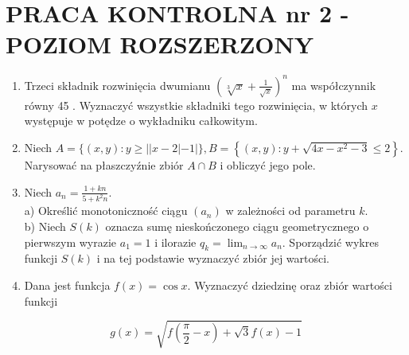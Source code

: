 \documentclass[10pt]{article}
\begin{document}
\section*{PRACA KONTROLNA nr 2 - POZIOM ROZSZERZONY}
\begin{enumerate}
  \item Trzeci składnik rozwinięcia dwumianu $\left(\sqrt[3]{x}+\frac{1}{\sqrt{x}}\right)^{n}$ ma współczynnik równy 45 . Wyznaczyć wszystkie składniki tego rozwinięcia, w których $x$ występuje w potędze o wykładniku całkowitym.
  \item Niech $A=\{(x, y): y \geqslant||x-2|-1|\}, B=\left\{(x, y): y+\sqrt{4 x-x^{2}-3} \leqslant 2\right\}$. Narysować na płaszczyźnie zbiór $A \cap B$ i obliczyć jego pole.
  \item Niech $a_{n}=\frac{1+k n}{5+k^{2} n}$.\\
a) Określić monotoniczność ciągu $\left(a_{n}\right)$ w zależności od parametru $k$.\\
b) Niech $S(k)$ oznacza sumę nieskończonego ciągu geometrycznego o pierwszym wyrazie $a_{1}=1$ i ilorazie $q_{k}=\lim _{n \rightarrow \infty} a_{n}$. Sporządzić wykres funkcji $S(k)$ i na tej podstawie wyznaczyć zbiór jej wartości.
  \item Dana jest funkcja $f(x)=\cos x$. Wyznaczyć dziedzinę oraz zbiór wartości funkcji
\end{enumerate}

$$
g(x)=\sqrt{f\left(\frac{\pi}{2}-x\right)+\sqrt{3} f(x)-1}
$$
\end{document}

